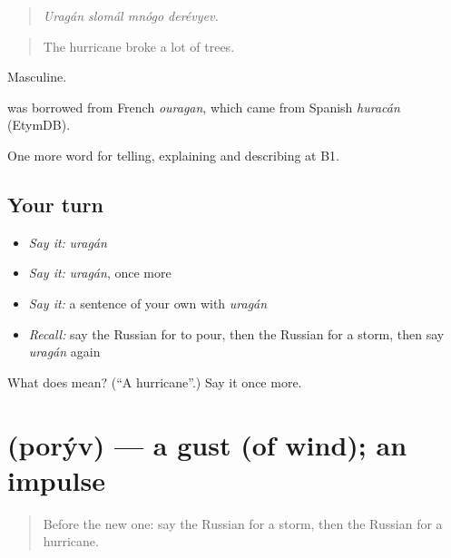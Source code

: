 \begin{quote}
\emph{Uragán slomál mnógo derévyev.}
\end{quote}

\begin{quote}
The hurricane broke a lot of trees.
\end{quote}

Masculine.

\begin{cousinweb}
\emph{} was borrowed from French \emph{ouragan}, which came from Spanish \emph{huracán} (EtymDB).
\end{cousinweb}

\begin{grammarlens}[title={What you've built}]
One more word for telling, explaining and describing at B1.
\end{grammarlens}

\subsection*{Your turn}
\begin{itemize}
\raggedright
  \item \emph{Say it:} \emph{uragán}
  \item \emph{Say it:} \emph{uragán}, once more
  \item \emph{Say it:} a sentence of your own with \emph{uragán}
  \item \emph{Recall:} say the Russian for to pour, then the Russian for a storm, then say \emph{uragán} again
\end{itemize}

\begin{tcolorbox}[breakable,colback=teal!4,colframe=teal!35!black,title={Before you move on}]
What does  mean? (\textquotedblleft{}A hurricane\textquotedblright{}.) Say it once more.
\end{tcolorbox}
\section[\texorpdfstring{\ru{порыв} (porýv)}{порыв (porýv)}]{ (porýv) — a gust (of wind); an impulse}

\label{lesson:RU-C466-poryv}



\begin{quote}
Before the new one: say the Russian for a storm, then the Russian for a hurricane.
\end{quote}


